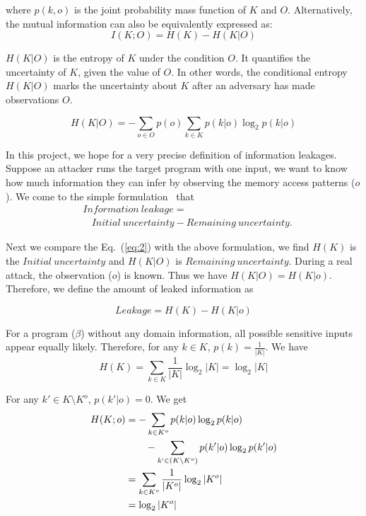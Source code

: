 where $p(k, o)$ is the joint probability mass function of $K$ and $O$.
Alternatively, the mutual information can also be equivalently expressed as:
\begin{equation} \label{eq:2}
    I(K;O) = H(K) - H(K|O)
\end{equation}

$H(K|O)$ is the entropy of $K$ under the condition $O$. It quantifies the
uncertainty of $K$, given the value of $O$. In other words, the conditional 
entropy $H(K|O)$ marks the uncertainty about $K$ after an adversary has 
made observations $O$.

\begin{equation}
    H(K|O) = - \sum_{o {\in} O} {p(o) \sum_{k {\in} K}{p(k|o)\log_2p(k|o)}}
\end{equation}

In this project, we hope for a very precise definition of information
leakages. Suppose an attacker runs the target program with one
input, we want to know how much information they can infer by observing the
memory access patterns ($o$). We come to the simple formulation~\cite{10.1007/978-3-642-00596-1_21,AskarovC12} %
that
\begin{align*}
     & \mathit{Information\ leakage} =                                         \\
     & ~~~~ \mathit{Initial\ uncertainty} - \mathit{Remaining\ uncertainty}.
\end{align*}

Next we compare the Eq.~(\ref{eq:2}) with the above formulation, we find $H(K)$
is the $\mathit{Initial\ uncertainty}$ and $H(K|O)$ is $\mathit{Remaining\
uncertainty}$. During a real attack, the observation ($o$) is known. Thus we
have $H(K|O) = H(K|o)$. Therefore, we define the amount of leaked information as

\begin{displaymath}
    Leakage = H(K) - H(K|o)
\end{displaymath}

For a program ($\beta$) without any domain information, all possible sensitive
inputs appear equally likely. Therefore, for any $k \in K$, $p(k) =
\frac{1}{|K|}$. We have
$$H(K) = \sum_{k {\in} K}\frac{1}{|K|}\log_2{|K|} = \log_2{|K|}$$

For any $k' \in K \setminus K^o$, $p(k'|o) = 0$. We get
\begin{align*}
    H(K;o) & = - \sum_{k {\in} K^o}{p(k|o)\log_2p(k|o)}                         \\
           & \qquad   - \sum_{k` {\in} (K \setminus K^o)}{p(k'|o)\log_2p(k'|o)} \\
           & = \sum_{k {\in} K^o}\frac{1}{|K^o|}\log_2{|K^o|}                   \\
           & = \log_2{|K^o|}
\end{align*}

